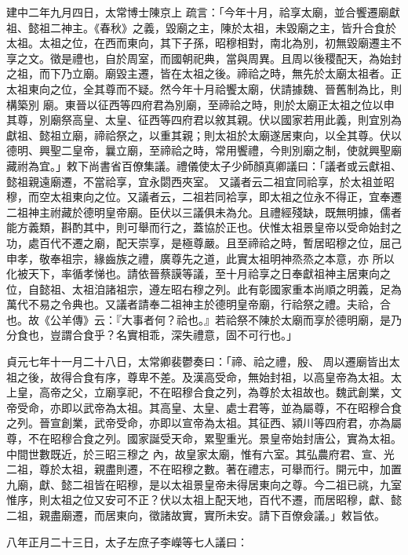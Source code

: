 \begin{pinyinscope}
 建中二年九月四日，太常博士陳京上
 疏言：「今年十月，祫享太廟，並合饗遷廟獻祖、懿祖二神主。《春秋》之義，毀廟之主，陳於太祖，未毀廟之主，皆升合食於太祖。太祖之位，在西而東向，其下子孫，昭穆相對，南北為別，初無毀廟遷主不享之文。徵是禮也，自於周室，而國朝祀典，當與周異。且周以後稷配天，為始封之祖，而下乃立廟。廟毀主遷，皆在太祖之後。禘祫之時，無先於太廟太祖者。正太祖東向之位，全其尊而不疑。然今年十月祫饗太廟，伏請據魏、晉舊制為比，則構築別
 廟。東晉以征西等四府君為別廟，至禘祫之時，則於太廟正太祖之位以申其尊，別廟祭高皇、太皇、征西等四府君以敘其親。伏以國家若用此義，則宜別為獻祖、懿祖立廟，禘祫祭之，以重其親；則太祖於太廟遂居東向，以全其尊。伏以德明、興聖二皇帝，曩立廟，至禘祫之時，常用饗禮，今則別廟之制，使就興聖廟藏祔為宜。」敕下尚書省百僚集議。禮儀使太子少師顏真卿議曰：「議者或云獻祖、懿祖親遠廟遷，不當祫享，宜永閟西夾室。
 又議者云二祖宜同祫享，於太祖並昭穆，而空太祖東向之位。又議者云，二祖若同袷享，即太祖之位永不得正，宜奉遷二祖神主祔藏於德明皇帝廟。臣伏以三議俱未為允。且禮經殘缺，既無明據，儒者能方義類，斟酌其中，則可舉而行之，蓋協於正也。伏惟太祖景皇帝以受命始封之功，處百代不遷之廟，配天崇享，是極尊嚴。且至禘祫之時，暫居昭穆之位，屈己申孝，敬奉祖宗，緣齒族之禮，廣尊先之道，此實太祖明神烝烝之本意，亦
 所以化被天下，率循孝悌也。請依晉蔡謨等議，至十月祫享之日奉獻祖神主居東向之位，自懿祖、太祖洎諸祖宗，遵左昭右穆之列。此有彰國家重本尚順之明義，足為萬代不易之令典也。又議者請奉二祖神主於德明皇帝廟，行祫祭之禮。夫祫，合也。故《公羊傳》云：『大事者何？祫也。』若祫祭不陳於太廟而享於德明廟，是乃分食也，豈謂合食乎？名實相乖，深失禮意，固不可行也。」



 貞元七年十一月二十八日，太常卿裴鬱奏曰：「禘、祫之禮，殷、
 周以遷廟皆出太祖之後，故得合食有序，尊卑不差。及漢高受命，無始封祖，以高皇帝為太祖。太上皇，高帝之父，立廟享祀，不在昭穆合食之列，為尊於太祖故也。魏武創業，文帝受命，亦即以武帝為太祖。其高皇、太皇、處士君等，並為屬尊，不在昭穆合食之列。晉宣創業，武帝受命，亦即以宣帝為太祖。其征西、潁川等四府君，亦為屬尊，不在昭穆合食之列。國家誕受天命，累聖重光。景皇帝始封唐公，實為太祖。中間世數既近，於三昭三穆之
 內，故皇家太廟，惟有六室。其弘農府君、宣、光二祖，尊於太祖，親盡則遷，不在昭穆之數。著在禮志，可舉而行。開元中，加置九廟，獻、懿二祖皆在昭穆，是以太祖景皇帝未得居東向之尊。今二祖已祧，九室惟序，則太祖之位又安可不正？伏以太祖上配天地，百代不遷，而居昭穆，獻、懿二祖，親盡廟遷，而居東向，徵諸故實，實所未安。請下百僚僉議。」敕旨依。



 八年正月二十三日，太子左庶子李嶸等七人議曰：




\end{pinyinscope}
